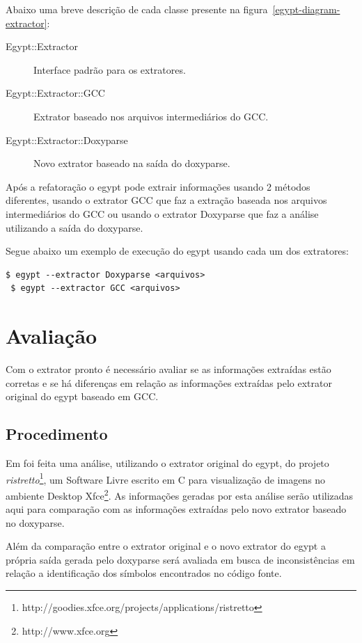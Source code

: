 Abaixo uma breve descrição de cada classe presente na
figura~\ref{egypt-diagram-extractor}:

\begin{description}
\item[Egypt::Extractor] Interface padrão para os extratores.
\item[Egypt::Extractor::GCC] Extrator baseado nos arquivos intermediários do GCC.
\item[Egypt::Extractor::Doxyparse] Novo extrator baseado na saída do doxyparse.
\end{description}

Após a refatoração o egypt pode extrair informações usando 2 métodos
diferentes, usando o extrator GCC que faz a extração baseada nos arquivos
intermediários do GCC ou usando o extrator Doxyparse que faz a análise
utilizando a saída do doxyparse.

Segue abaixo um exemplo de execução do egypt usando cada um dos extratores:

\begin{Verbatim}[frame=single,fontsize=\relsize{-2},fontfamily=courier]
 $ egypt --extractor Doxyparse <arquivos>
 $ egypt --extractor GCC <arquivos>
\end{Verbatim}

\chapter{Avaliação} \label{ch:avaliacao}

Com o extrator pronto é necessário avaliar se as informações extraídas estão
corretas e se há diferenças em relação as informações extraídas pelo extrator
original do egypt baseado em GCC.

\section{Procedimento}

Em \cite{structuralComplexityEvolution} foi feita uma análise, utilizando o
extrator original do egypt, do projeto {\it
ristretto}\footnote{http://goodies.xfce.org/projects/applications/ristretto},
um Software Livre escrito em C para visualização de imagens no ambiente Desktop
Xfce\footnote{http://www.xfce.org}. As informações geradas por esta análise
serão utilizadas aqui para comparação com as informações extraídas pelo novo
extrator baseado no doxyparse.

Além da comparação entre o extrator original e o novo extrator do egypt a
própria saída gerada pelo doxyparse será avaliada em busca de inconsistências
em relação a identificação dos símbolos encontrados no código fonte.

